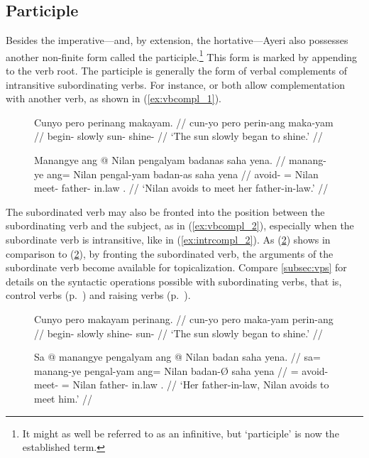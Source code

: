 
\subsection{Participle}
\label{subsec:participle}
Besides the imperative---and, by extension, the hortative---Ayeri also
possesses another non-finite form called the participle.\footnote{It might as
well be referred to as an infinitive, but `participle' is now the established
term.} This form is marked by appending  to the verb root. The
participle is generally the form of verbal complements of intransitive
subordinating verbs. For instance,  or
 both allow complementation with another verb, as
shown in (\ref{ex:vbcompl_1}).

\begin{figure}[h]
\pex\label{ex:vbcompl_1}
\a\label{ex:intrcompl_1}\begingl
	\gla Cunyo pero perinang makayam. // 
	\glb cun-yo pero perin-ang maka-yam // 
	\glc begin-\TsgN{} slowly sun-\Aarg{} shine-\Ptcp{} //
	\glft `The sun slowly began to shine.' //
\endgl

\a\label{ex:trcompl_1}\begingl
	\gla Manangye ang @ Nilan pengalyam badanas saha yena. //
	\glb manang-ye ang= Nilan pengal-yam badan-as saha yena //
	\glc avoid-\TsgF{} \Aarg{}= Nilan meet-\Ptcp{} father-\Parg{} in.law 
		\TsgF{}.\Gen{} //
	\glft `Nilan avoids to meet her father-in-law.' //
\endgl
\xe
\end{figure}

The subordinated verb may also be fronted into the position between the
subordinating verb and the subject, as in (\ref{ex:vbcompl_2}), especially when
the subordinate verb is intransitive, like  in
(\ref{ex:intrcompl_2}). As (\ref{ex:trcompl_2}) shows in comparison to
(\ref{ex:trcompl_2}), by fronting the subordinated verb, the arguments of the
subordinate verb become available for topicalization. Compare
\autoref{subsec:vps} for details on the syntactic operations possible with
subordinating verbs, that is, control verbs (p.~\pageref{subsubsec:ctrlvb}) and
raising verbs (p.~\pageref{subsubsec:raisvb}).

\begin{figure}[h]
\pex\label{ex:vbcompl_2}
\a\label{ex:intrcompl_2}\begingl
	\gla Cunyo pero makayam perinang. // 
	\glb cun-yo pero maka-yam perin-ang // 
	\glc begin-\TsgN{} slowly shine-\Ptcp{} sun-\Aarg{} //
	\glft `The sun slowly began to shine.' //
\endgl

\a\label{ex:trcompl_2}\begingl
	\gla Sa @ manangye pengalyam ang @ Nilan badan saha yena. //
	\glb sa= manang-ye pengal-yam ang= Nilan badan-Ø saha yena //
	\glc \PatT{}= avoid-\TsgF{} meet-\Ptcp{} \Aarg{}= Nilan father-\Parg{}
		in.law \TsgF{}.\Gen{} //
	\glft `Her father-in-law, Nilan avoids to meet him.' //
\endgl
\xe
\end{figure}

